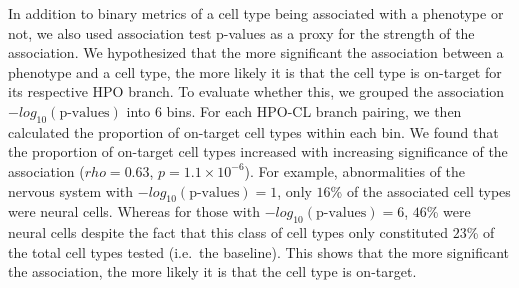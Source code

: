 \documentclass[
]{article}
\begin{document}
In addition to binary metrics of a cell type being associated with a
phenotype or not, we also used association test p-values as a proxy for
the strength of the association. We hypothesized that the more
significant the association between a phenotype and a cell type, the
more likely it is that the cell type is on-target for its respective HPO
branch. To evaluate whether this, we grouped the association
\(-log_{10}(\text{p-values})\) into 6 bins. For each HPO-CL branch
pairing, we then calculated the proportion of on-target cell types
within each bin. We found that the proportion of on-target cell types
increased with increasing significance of the association
(\(rho=\)\(0.63\), \(p=\)\(1.1 \times 10^{-6}\)). For example,
abnormalities of the nervous system with
\(-log_{10}(\text{p-values}) = 1\), only \(16\)\% of the associated cell
types were neural cells. Whereas for those with
\(-log_{10}(\text{p-values}) = 6\), \(46\)\% were neural cells despite
the fact that this class of cell types only constituted \(23\)\% of the
total cell types tested (i.e.~the baseline). This shows that the more
significant the association, the more likely it is that the cell type is
on-target.
\end{document}
